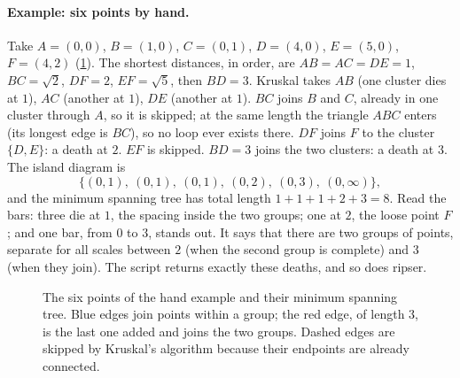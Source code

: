 \paragraph{Example: six points by hand.} Take $A=(0,0)$, $B=(1,0)$, $C=(0,1)$, $D=(4,0)$, $E=(5,0)$, $F=(4,2)$
(\cref{12b:fig:six}). The shortest distances, in order, are $AB=AC=DE=1$, $BC=\sqrt2$, $DF=2$, $EF=\sqrt5$, then
$BD=3$. Kruskal takes $AB$ (one cluster dies at $1$), $AC$ (another at $1$), $DE$ (another at $1$). $BC$ joins $B$
and $C$, already in one cluster through $A$, so it is skipped; at the same length the triangle $ABC$ enters (its
longest edge is $BC$), so no loop ever exists there. $DF$ joins $F$ to the cluster $\{D,E\}$: a death at $2$. $EF$ is
skipped. $BD=3$ joins the two clusters: a death at $3$. The island diagram is
\begin{equation}
  \{(0,1),\ (0,1),\ (0,1),\ (0,2),\ (0,3),\ (0,\infty)\},
  \label{12b:eq:six}
\end{equation}
and the minimum spanning tree has total length $1+1+1+2+3=8$. Read the bars: three die at $1$, the spacing inside
the two groups; one at $2$, the loose point $F$; and one bar, from $0$ to $3$, stands out. It says that there are two
groups of points, separate for all scales between $2$ (when the second group is complete) and $3$ (when they join).
The script  returns exactly these deaths, and so does ripser.

\begin{figure}[htbp]
\centering
{}
\caption{The six points of the hand example and their minimum spanning tree. Blue edges join points within a group;
the red edge, of length $3$, is the last one added and joins the two groups. Dashed edges are skipped by Kruskal's
algorithm because their endpoints are already connected.}
\label{12b:fig:six}
\end{figure}

